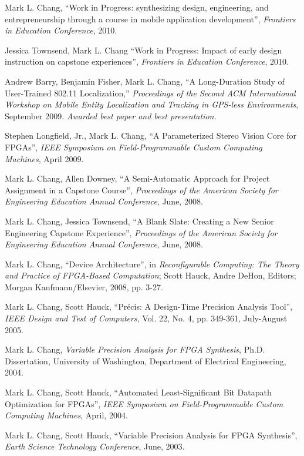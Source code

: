 \documentclass[line]{res}
\begin{document}
\begin{resume}
	Mark L. Chang, ``Work in Progress: synthesizing design, engineering, and entrepreneurship through a course in mobile application development'', \textit{Frontiers in Education Conference}, 2010.
	
	Jessica Townsend, Mark L. Chang ``Work in Progress: Impact of early design instruction on capstone experiences'', \textit{Frontiers in Education Conference}, 2010.
	
	Andrew Barry, Benjamin Fisher, Mark L. Chang, ``A Long-Duration Study of User-Trained 802.11 Localization,'' \emph{Proceedings of the Second ACM International Workshop on Mobile Entity Localization and Tracking in GPS-less Environments}, September 2009. \textit{Awarded best paper and best presentation.}
	
	Stephen Longfield, Jr., Mark L. Chang, ``A Parameterized Stereo Vision Core for \mbox{FPGAs}'', \emph{IEEE Symposium on Field-Programmable Custom Computing Machines}, April 2009.
	
	Mark L. Chang, Allen Downey, ``A Semi-Automatic Approach for Project Assignment in a Capstone Course'', \emph{Proceedings of the American Society for Engineering Education Annual Conference}, June, 2008.
	
	Mark L. Chang, Jessica Townsend, ``A Blank Slate: Creating a New Senior Engineering Capstone Experience'', \emph{Proceedings of the American Society for Engineering Education Annual Conference}, June, 2008.
	
	Mark L. Chang, ``Device Architecture'', in \emph{Reconfigurable Computing: The Theory and Practice of FPGA-Based Computation}; Scott Hauck, Andre DeHon, Editors; Morgan Kaufmann/Elsevier, 2008, pp. 3-27.
	
	Mark L. Chang, Scott Hauck, ``Pr\'{e}cis: A Design-Time Precision Analysis Tool'', \emph{IEEE Design and Test of Computers}, Vol. 22, No. 4, pp. 349-361, July-August 2005.
	
	Mark L. Chang, \emph{Variable Precision Analysis for FPGA Synthesis}, Ph.D. Dissertation, University of Washington, Department of Electrical Engineering, 2004.
	
	Mark L. Chang, Scott Hauck, ``Automated Least-Significant Bit Datapath Optimization for \mbox{FPGAs}'', \emph{IEEE Symposium on Field-Programmable Custom Computing Machines}, April, 2004.
	
	Mark L. Chang, Scott Hauck, ``Variable Precision Analysis for FPGA Synthesis'', \emph{Earth Science Technology Conference}, June, 2003.
	

\end{resume}
\end{document}
